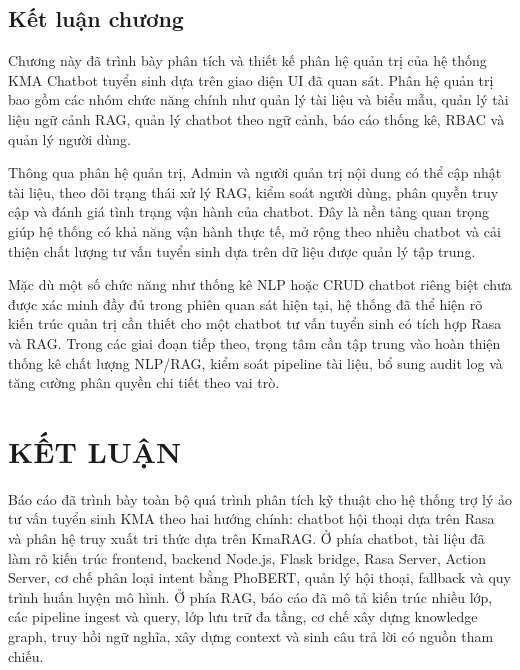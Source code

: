 \documentclass[12pt,a4paper]{report}
\begin{document}
\section{Kết luận chương}

Chương này đã trình bày phân tích và thiết kế phân hệ quản trị của hệ thống KMA Chatbot tuyển sinh dựa trên giao diện UI đã quan sát. Phân hệ quản trị bao gồm các nhóm chức năng chính như quản lý tài liệu và biểu mẫu, quản lý tài liệu ngữ cảnh RAG, quản lý chatbot theo ngữ cảnh, báo cáo thống kê, RBAC và quản lý người dùng.

Thông qua phân hệ quản trị, Admin và người quản trị nội dung có thể cập nhật tài liệu, theo dõi trạng thái xử lý RAG, kiểm soát người dùng, phân quyền truy cập và đánh giá tình trạng vận hành của chatbot. Đây là nền tảng quan trọng giúp hệ thống có khả năng vận hành thực tế, mở rộng theo nhiều chatbot và cải thiện chất lượng tư vấn tuyển sinh dựa trên dữ liệu được quản lý tập trung.

Mặc dù một số chức năng như thống kê NLP hoặc CRUD chatbot riêng biệt chưa được xác minh đầy đủ trong phiên quan sát hiện tại, hệ thống đã thể hiện rõ kiến trúc quản trị cần thiết cho một chatbot tư vấn tuyển sinh có tích hợp Rasa và RAG. Trong các giai đoạn tiếp theo, trọng tâm cần tập trung vào hoàn thiện thống kê chất lượng NLP/RAG, kiểm soát pipeline tài liệu, bổ sung audit log và tăng cường phân quyền chi tiết theo vai trò.

\endgroup

\label{chap:implementation}

\clearpage
\chapter*{KẾT LUẬN}
{}

Báo cáo đã trình bày toàn bộ quá trình phân tích kỹ thuật cho hệ thống trợ lý ảo tư vấn tuyển sinh KMA theo hai hướng chính: chatbot hội thoại dựa trên Rasa và phân hệ truy xuất tri thức dựa trên KmaRAG. Ở phía chatbot, tài liệu đã làm rõ kiến trúc frontend, backend Node.js, Flask bridge, Rasa Server, Action Server, cơ chế phân loại intent bằng PhoBERT, quản lý hội thoại, fallback và quy trình huấn luyện mô hình. Ở phía RAG, báo cáo đã mô tả kiến trúc nhiều lớp, các pipeline ingest và query, lớp lưu trữ đa tầng, cơ chế xây dựng knowledge graph, truy hồi ngữ nghĩa, xây dựng context và sinh câu trả lời có nguồn tham chiếu.
\end{document}
